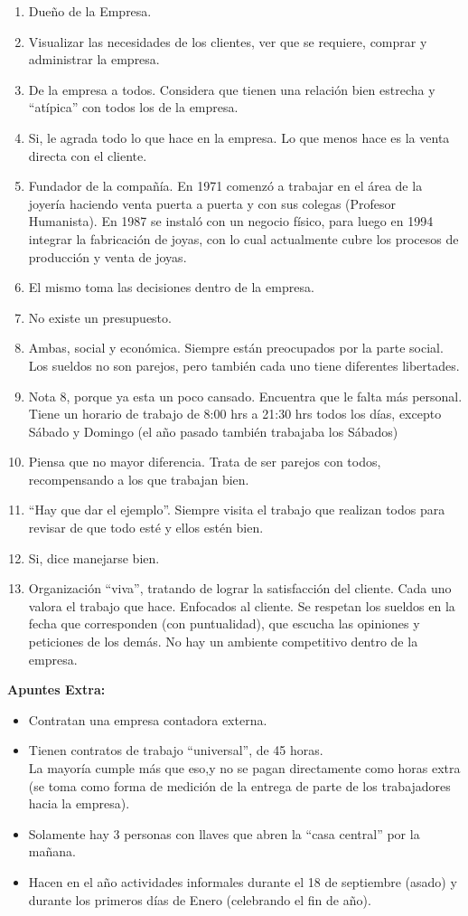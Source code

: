 \begin{enumerate}
	\item Dueño de la Empresa.
	\item Visualizar las necesidades de los clientes, ver que se requiere, comprar y administrar la
		empresa.
	\item De la empresa a todos. Considera que tienen una relación bien estrecha y ``atípica'' con
		todos los de la empresa. 
	\item Si, le agrada todo lo que hace en la empresa. Lo que menos hace es la venta directa con el
		cliente.
	\item Fundador de la compañía. En 1971 comenzó a trabajar en el área de la joyería haciendo venta
		puerta a puerta y con sus colegas (Profesor Humanista). En 1987 se instaló con un negocio
		físico, para luego en 1994 integrar la fabricación de joyas, con lo cual actualmente
		cubre los procesos de producción y venta de joyas.
	\item El mismo toma las decisiones dentro de la empresa.
	\item No existe un presupuesto.
	\item Ambas, social y económica. Siempre están preocupados por la parte social. Los sueldos no
		son parejos, pero también cada uno tiene diferentes libertades.
	\item Nota 8, porque ya esta un poco cansado. Encuentra que le falta más personal. Tiene un
		horario de trabajo de 8:00 hrs a 21:30 hrs todos los días, excepto Sábado y Domingo (el año pasado
		también trabajaba los Sábados)
	\item Piensa que no mayor diferencia. Trata de ser parejos con todos, recompensando a los que
		trabajan bien.
	\item ``Hay que dar el ejemplo''. Siempre visita el trabajo que realizan todos para revisar de
		que todo esté y ellos estén bien.
	\item Si, dice manejarse bien.
	\item Organización ``viva'', tratando de lograr la satisfacción del cliente. Cada uno valora el
		trabajo que hace. Enfocados al cliente. Se respetan los sueldos en la fecha que corresponden (con
		puntualidad), que escucha las opiniones y peticiones de los demás. No hay un ambiente competitivo dentro
		de la empresa.
\end{enumerate}
\textbf{Apuntes Extra:}
\begin{itemize}
	\item Contratan una empresa contadora externa.
	\item Tienen contratos de trabajo ``universal'', de 45 horas.\\ La mayoría cumple más que eso,y
		no se pagan directamente como horas extra (se toma como forma de medición de la entrega
		de parte de los trabajadores hacia la empresa). 
	\item Solamente hay 3 personas con llaves que abren la ``casa central'' por la mañana.
	\item Hacen en el año actividades informales durante el 18 de septiembre (asado) y durante los
		primeros días de Enero (celebrando el fin de año).
\end{itemize}
